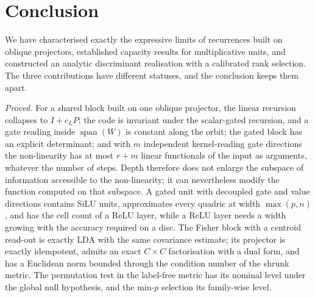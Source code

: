 \documentclass[11pt,a4paper]{article}
\theoremstyle{plain}
\theoremstyle{definition}
\theoremstyle{remark}
\newcommand{\spn}{\operatorname{span}}
\begin{document}
\section{Conclusion}
\label{sec:conclusion}
We have characterised exactly the expressive limits of recurrences built
on oblique projectors, established capacity results for multiplicative
units, and constructed an analytic discriminant realisation with a
calibrated rank selection. The three contributions have different
statuses, and the conclusion keeps them apart.

\emph{Proved.} For a shared block built on one oblique projector, the
linear recursion collapses to $I+c_LP$; the code is invariant under the
scalar-gated recursion, and a gate reading inside $\spn(W)$ is constant
along the orbit; the gated block has an explicit determinant; and with $m$
independent kernel-reading gate directions the non-linearity has at most
$r+m$ linear functionals of the input as arguments, whatever the number of
steps. Depth therefore does not enlarge the subspace of information
accessible to the non-linearity; it can nevertheless modify the function
computed on that subspace. A gated unit with decoupled gate and value
directions contains SiLU units, approximates every quadric at width
$\max(p,n)$, and has the cell count of a ReLU layer, while a ReLU layer
needs a width growing with the accuracy required on a disc. The Fisher
block with a centroid read-out is exactly LDA with the same covariance
estimate; its projector is exactly idempotent, admits an exact $C\times C$
factorisation with a dual form, and has a Euclidean norm bounded through
the condition number of the shrunk metric. The permutation test in the
label-free metric has its nominal level under the global null hypothesis,
and the min-$p$ selection its family-wise level.
\end{document}
